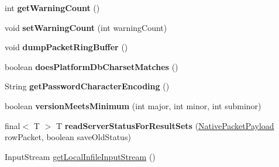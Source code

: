\begin{DoxyCompactItemize}
\item 
\mbox{\label{classcom_1_1mysql_1_1cj_1_1protocol_1_1a_1_1_native_protocol_a69cbb85875d11ae115f0b0364edc0261}} 
int {\bfseries get\+Warning\+Count} ()
\item 
\mbox{\label{classcom_1_1mysql_1_1cj_1_1protocol_1_1a_1_1_native_protocol_a4889b820326c52e18ac59492675362a1}} 
void {\bfseries set\+Warning\+Count} (int warning\+Count)
\item 
\mbox{\label{classcom_1_1mysql_1_1cj_1_1protocol_1_1a_1_1_native_protocol_aa4d8d6321c673587332f112edc89a797}} 
void {\bfseries dump\+Packet\+Ring\+Buffer} ()
\item 
\mbox{\label{classcom_1_1mysql_1_1cj_1_1protocol_1_1a_1_1_native_protocol_afa8a809109f6cad91488d1f1dc4bcb4f}} 
boolean {\bfseries does\+Platform\+Db\+Charset\+Matches} ()
\item 
\mbox{\label{classcom_1_1mysql_1_1cj_1_1protocol_1_1a_1_1_native_protocol_a616ff80ada9364f47f0282b2046c9b82}} 
String {\bfseries get\+Password\+Character\+Encoding} ()
\item 
\mbox{\label{classcom_1_1mysql_1_1cj_1_1protocol_1_1a_1_1_native_protocol_a75978c3d6814145dfb5d0465d3185bd0}} 
boolean {\bfseries version\+Meets\+Minimum} (int major, int minor, int subminor)
\item 
\mbox{\label{classcom_1_1mysql_1_1cj_1_1protocol_1_1a_1_1_native_protocol_a0e6a8f5b4abd6810e2e4ca5b2ebf15fd}} 
final$<$ T $>$ T {\bfseries read\+Server\+Status\+For\+Result\+Sets} (\mbox{\hyperlink{classcom_1_1mysql_1_1cj_1_1protocol_1_1a_1_1_native_packet_payload}{Native\+Packet\+Payload}} row\+Packet, boolean save\+Old\+Status)
\item 
Input\+Stream \mbox{\hyperlink{classcom_1_1mysql_1_1cj_1_1protocol_1_1a_1_1_native_protocol_a27e42d277d58cc8bc89f098b9ac90691}{get\+Local\+Infile\+Input\+Stream}} ()

\end{DoxyCompactItemize}
